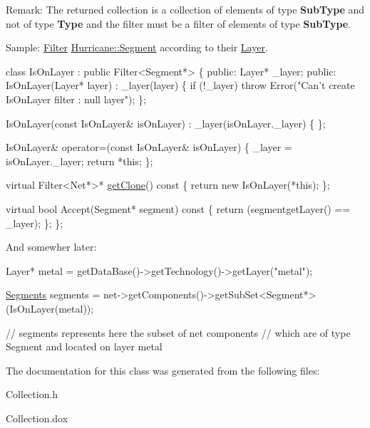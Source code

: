 \begin{DoxyParagraph}{Remark\-:}
The returned collection is a collection of elements of type {\bfseries Sub\-Type} and not of type {\bfseries Type} and the filter must be a filter of elements of type {\bfseries Sub\-Type}.
\end{DoxyParagraph}
\begin{DoxyParagraph}{Sample\-:}
\hyperlink{classHurricane_1_1Filter}{Filter} \hyperlink{classHurricane_1_1Segment}{Hurricane\-::\-Segment} according to their \hyperlink{classHurricane_1_1Layer}{Layer}. 
\begin{DoxyCode}
\textcolor{keyword}{class }IsOnLayer : \textcolor{keyword}{public} Filter<Segment*> \{
   \textcolor{keyword}{public}:
      Layer* \_layer;
   \textcolor{keyword}{public}:
      IsOnLayer(Layer* layer)
        : \_layer(layer)
      \{
         \textcolor{keywordflow}{if} (!\_layer) \textcolor{keywordflow}{throw} Error(\textcolor{stringliteral}{"Can't create IsOnLayer filter : null layer"});
      \};
 
      IsOnLayer(\textcolor{keyword}{const} IsOnLayer& isOnLayer)
        : \_layer(isOnLayer.\_layer)
      \{ \};
 
      IsOnLayer& operator=(\textcolor{keyword}{const} IsOnLayer& isOnLayer)
      \{
         \_layer = isOnLayer.\_layer;
         \textcolor{keywordflow}{return} *\textcolor{keyword}{this};
      \};
 
      \textcolor{keyword}{virtual} Filter<Net*>* \hyperlink{classHurricane_1_1Collection_ac75b91d3952b36e14f21174958523924}{getClone}()\textcolor{keyword}{ const}
\textcolor{keyword}{      }\{
         \textcolor{keywordflow}{return} \textcolor{keyword}{new} IsOnLayer(*\textcolor{keyword}{this});
      \};
 
      \textcolor{keyword}{virtual} \textcolor{keywordtype}{bool} Accept(Segment* segment)\textcolor{keyword}{ const}
\textcolor{keyword}{      }\{
         \textcolor{keywordflow}{return} (segmentgetLayer() == \_layer);
      \};
\};
\end{DoxyCode}

\end{DoxyParagraph}
And somewher later\-: 
\begin{DoxyCode}
Layer* metal = getDataBase()->getTechnology()->getLayer(\textcolor{stringliteral}{"metal"});
 
\hyperlink{namespaceHurricane_a30748fa53a81cb597d4a13d651238716}{Segments} segments = net->getComponents()->getSubSet<Segment*>(IsOnLayer(metal));
 
\textcolor{comment}{// segments represents here the subset of net components}
\textcolor{comment}{// which are of type Segment and located on layer metal}
\end{DoxyCode}
 

The documentation for this class was generated from the following files\-:\begin{DoxyCompactItemize}
\item 
Collection.\-h\item 
Collection.\-dox\end{DoxyCompactItemize}
